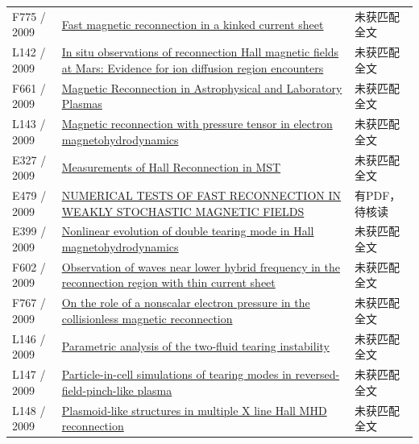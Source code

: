 \begin{longtable}{P{24mm}P{97mm}P{27mm}}
F775 / 2009 & \href{https://doi.org/10.1063/1.3106685}{Fast magnetic reconnection in a kinked current sheet} & 未获匹配全文\\

L142 / 2009 & \href{https://doi.org/10.1029/2009ja014544}{In situ observations of reconnection Hall magnetic fields at Mars: Evidence for ion diffusion region encounters} & 未获匹配全文\\

F661 / 2009 & \href{https://doi.org/10.1146/annurev-astro-082708-101726}{Magnetic Reconnection in Astrophysical and Laboratory Plasmas} & 未获匹配全文\\

L143 / 2009 & \href{https://doi.org/10.1063/1.3122050}{Magnetic reconnection with pressure tensor in electron magnetohydrodynamics} & 未获匹配全文\\

E327 / 2009 & \href{http://absimage.aps.org/image/DPP09/MWS_DPP09-2009-020006.pdf}{Measurements of Hall Reconnection in MST} & 未获匹配全文\\

E479 / 2009 & \href{https://doi.org/10.1088/0004-637x/700/1/63}{NUMERICAL TESTS OF FAST RECONNECTION IN WEAKLY STOCHASTIC MAGNETIC FIELDS} & 有PDF，待核读\\

E399 / 2009 & \href{https://doi.org/10.1063/1.3276534}{Nonlinear evolution of double tearing mode in Hall magnetohydrodynamics} & 未获匹配全文\\

F602 / 2009 & \href{https://doi.org/10.1029/2008ja013427}{Observation of waves near lower hybrid frequency in the reconnection region with thin current sheet} & 未获匹配全文\\

F767 / 2009 & \href{https://doi.org/10.1063/1.3266419}{On the role of a nonscalar electron pressure in the collisionless magnetic reconnection} & 未获匹配全文\\

L146 / 2009 & \href{https://doi.org/10.1088/0741-3335/51/5/055018}{Parametric analysis of the two-fluid tearing instability} & 未获匹配全文\\

L147 / 2009 & \href{https://doi.org/10.1063/1.3079075}{Particle-in-cell simulations of tearing modes in reversed-field-pinch-like plasma} & 未获匹配全文\\

L148 / 2009 & \href{https://doi.org/10.1029/2009ja014257}{Plasmoid‐like structures in multiple X line Hall MHD reconnection} & 未获匹配全文\\


\end{longtable}
